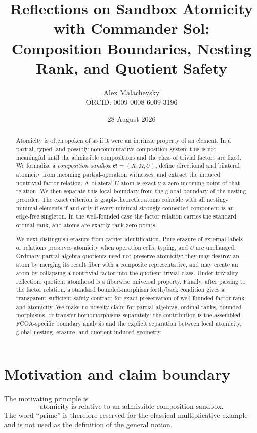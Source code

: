 \documentclass[11pt]{article}
\title{Reflections on Sandbox Atomicity with Commander Sol:\\Composition Boundaries, Nesting Rank, and Quotient Safety}
\author{Alex Malachevsky\\\small ORCID: 0009-0008-6009-3196}
\date{28 August 2026}
\theoremstyle{definition}
\theoremstyle{remark}
\newcommand{\Sbx}{\mathfrak S}
\begin{document}
\maketitle

\begin{abstract}
Atomicity is often spoken of as if it were an intrinsic property of an element. In a partial, typed, and possibly noncommutative composition system this is not meaningful until the admissible compositions and the class of trivial factors are fixed. We formalize a \emph{composition sandbox} \(\Sbx=(X,\Omega,U)\), define directional and bilateral atomicity from incoming partial-operation witnesses, and extract the induced nontrivial factor relation. A bilateral \(U\)-atom is exactly a zero-incoming point of that relation. We then separate this local boundary from the global boundary of the nesting preorder. The exact criterion is graph-theoretic: atoms coincide with all nesting-minimal elements if and only if every minimal strongly connected component is an edge-free singleton. In the well-founded case the factor relation carries the standard ordinal rank, and atoms are exactly rank-zero points.

We next distinguish erasure from carrier identification. Pure erasure of external labels or relations preserves atomicity when operation cells, typing, and \(U\) are unchanged. Ordinary partial-algebra quotients need not preserve atomicity: they may destroy an atom by merging its result fiber with a composite representative, and may create an atom by collapsing a nontrivial factor into the quotient trivial class. Under triviality reflection, quotient atomhood is a fiberwise universal property. Finally, after passing to the factor relation, a standard bounded-morphism forth/back condition gives a transparent sufficient safety contract for exact preservation of well-founded factor rank and atomicity. We make no novelty claim for partial algebras, ordinal ranks, bounded morphisms, or transfer homomorphisms separately; the contribution is the assembled FCOA-specific boundary analysis and the explicit separation between local atomicity, global nesting, erasure, and quotient-induced geometry.
\end{abstract}

\section{Motivation and claim boundary}

The motivating principle is
\begin{equation}
\boxed{\text{atomicity is relative to an admissible composition sandbox}.}
\label{eq:thesis}
\end{equation}
The word ``prime'' is therefore reserved for the classical multiplicative example and is not used as the definition of the general notion.
\end{document}
